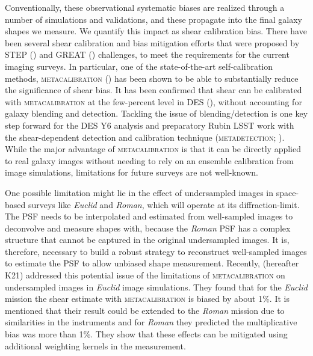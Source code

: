\documentclass[fleqn,usenatbib]{mnras}
\begin{document}
Conventionally, these observational systematic biases are realized through a number of simulations and validations, and these propagate into the final galaxy shapes we measure. We quantify this impact as shear calibration bias. There have been several shear calibration and bias mitigation efforts that were proposed by STEP (\citealt{2006MNRAS.368.1323H, 2007MNRAS.376...13M}) and GREAT (\citealt{2010MNRAS.405.2044B, 2013ApJS..205...12K, 2015MNRAS.450.2963M}) challenges, to meet the requirements for the current imaging surveys. In particular, one of the state-of-the-art self-calibration methods, \textsc{metacalibration} (\citealt{2017arXiv170202600H, 2017ApJ...841...24S}) has been shown to be able to substantially reduce the significance of shear bias. It has been confirmed that shear can be calibrated with \textsc{metacalibration} at the few-percent level in DES (\citealt{2018MNRAS.481.1149Z, 2020arXiv201103408G}), without accounting for galaxy blending and detection. Tackling the issue of blending/detection is one key step forward for the DES Y6 analysis and preparatory Rubin LSST work with the shear-dependent detection and calibration technique (\textsc{metadetection}; \citealt{2020ApJ...902..138S}). While the major advantage of \textsc{metacalibration} is that it can be directly applied to real galaxy images without needing to rely on an ensemble calibration from image simulations, limitations for future surveys are not well-known. 

One possible limitation might lie in the effect of undersampled images in space-based surveys like \emph{Euclid} and \emph{Roman}, which will operate at its diffraction-limit. The PSF needs to be interpolated and estimated from well-sampled images to deconvolve and measure shapes with, because the \emph{Roman} PSF has a complex structure that cannot be captured in the original undersampled images. It is, therefore, necessary to build a robust strategy to reconstruct well-sampled images to estimate the PSF to allow unbiased shape measurement.
Recently, \cite{2021MNRAS.502.4048K} (hereafter K21) addressed this potential issue of the limitations of \textsc{metacalibration} on undersampled images in \emph{Euclid} image simulations. They found that for the \emph{Euclid} mission the shear estimate with \textsc{metacalibration} is biased by about 1$\%$. It is mentioned that their result could be extended to the \emph{Roman} mission due to similarities in the instruments and for \emph{Roman} they predicted the multiplicative bias was more than 1\%. They show that these effects can be mitigated using additional weighting kernels in the measurement. 
\end{document}
